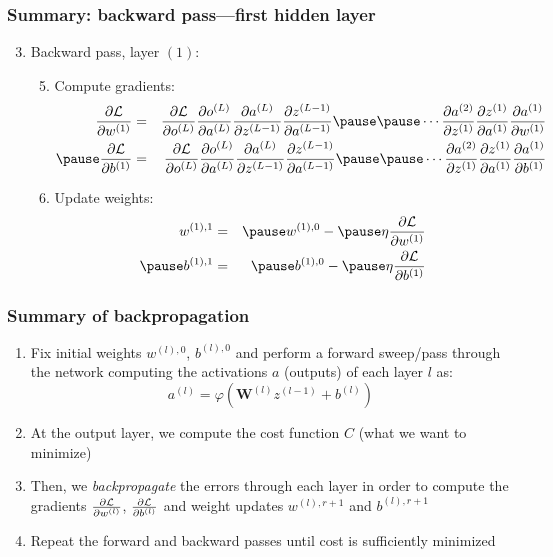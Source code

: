 \documentclass[smaller]{beamer}
\begin{document}
\begin{frame}
  \frametitle{Summary: backward pass---first hidden layer}
  \begin{enumerate}[<+->]\setcounter{enumi}{2}
  \item Backward pass, layer $(1)$:\pause
        \begin{enumerate}[<+->] \setcounter{enumii}{4}
    \item Compute gradients: \pause
    \begin{eqnarray}
      \pd{\mc{L}}{w^{(1)}} &=&  \pd{\mc{L}}{o^{(L)}}\pd{o^{(L)}}{a^{(L)}}\pd{a^{(L)}}{z^{(L-1)}}\pd{z^{(L-1)}}{a^{(L-1)}} \pause
                          \pause\cdots  
                          \pd{a^{(2)}}{z^{(1)}}\pd{z^{(1)}}{a^{(1)}}\pd{a^{(1)}}{w^{(1)}}\\\pause
      \pd{\mc{L}}{b^{(1)}} &=&  \pd{\mc{L}}{o^{(L)}}\pd{o^{(L)}}{a^{(L)}}\pd{a^{(L)}}{z^{(L-1)}}\pd{z^{(L-1)}}{a^{(L-1)}} \pause
                          \pause\cdots  
                          \pd{a^{(2)}}{z^{(1)}}\pd{z^{(1)}}{a^{(1)}}\pd{a^{(1)}}{b^{(1)}}
    \end{eqnarray}
    \pause
  \item Update weights: \pause
    \begin{eqnarray}
      w^{(1), 1}  &=& \pause  w^{(1),0} - \pause \eta \pd{\mc{L}}{w^{(1)}}  \\\pause
      b^{(1), 1}  &=&  \pause b^{(1),0} - \pause \eta \pd{\mc{L}}{b^{(1)}}  
    \end{eqnarray}
  \end{enumerate}
  \end{enumerate}
\end{frame}


\begin{frame}
  \frametitle{Summary of backpropagation}\pause

  \begin{enumerate}[<+->]
  \item Fix initial weights $w^{(l),0}$, $b^{(l),0}$ and perform a forward sweep/pass through the network computing the activations $a$ (outputs) of each layer $l$ as:\pause
    \begin{equation}
      a^{(l)} = \varphi(\bm W^{(l)} z^{(l-1)} + b^{(l)})
    \end{equation}
  \item At the output layer, we compute the cost function $C$ (what we want to minimize)
  \item Then, we {\it backpropagate} the errors through each layer in order to compute the gradients $\frac{\partial{\mathcal{L}}}{\partial{w^{(l)}}}$, $\frac{\partial{\mathcal{L}}}{\partial{b^{(l)}}}$ \pause
    and  weight updates  $w^{(l),r+1}$ and $b^{(l),r+1}$
\item Repeat the forward and backward passes until cost is sufficiently minimized
  \end{enumerate}
  
\end{frame}
\end{document}
